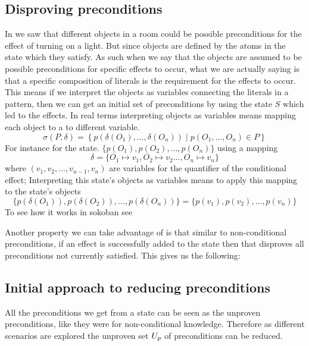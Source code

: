 \documentclass[\master/Master.tex]{subfiles}
\begin{document}
\subsection{Disproving preconditions}
In   we saw that different objects in a room could be possible preconditions for the effect of turning on a light. But since 
objects are defined by the atoms in the state which they satisfy. As such when we say that the objects are assumed to be possible preconditions for specific effects to occur, what we are actually saying is that a specific composition of literals is the requirement for the effects to occur.
This means if we interpret the objects as variables connecting the literals in a pattern, then we can get an initial set of preconditions by using the state $S$ which led to the effects. In real terms interpreting objects as variables means mapping each object 
to a to different variable.
\begin{equation}\label{eq:ca:substitution}
	\sigma(P,\delta) =  \left\{p\left(\delta(O_1),\ldots,\delta(O_n) \right) \mid p(O_1,\ldots,O_n) \in P  \right\}
\end{equation}
For instance for the state.
$\{ p(O_1), p(O_2),\ldots,p(O_n)\}$ using a mapping
\begin{equation*}
\delta = \{O_1 \mapsto v_1, O_2 \mapsto v_2 \ldots, O_n \mapsto v_n\}
\end{equation*}
where $(v_1, v_2,\dots,v_{n-1},v_n)$ are variables for the quantifier of the conditional effect; Interpreting this state's objects as variables means to apply this mapping to the state's objects
\begin{equation*}
\{ p(\delta(O_1)), p(\delta(O_2)),\ldots,p(\delta(O_n))\} = \{ p(v_1), p(v_2),\ldots,p(v_n)\}
\end{equation*}
To see how it works in sokoban see 

Another property we can take advantage of is that similar to non-conditional preconditions, if an effect is successfully added to the state then that disproves all preconditions not currently satisfied.
This gives us the following:



\subsection{Initial approach to reducing preconditions}\label{ssec:ca:init-approach}

All the preconditions we get from a state can be seen as the unproven preconditions, like they were for non-conditional knowledge.
Therefore as different scenarios are explored the unproven set $U_p$ of preconditions can be reduced.
\end{document}
